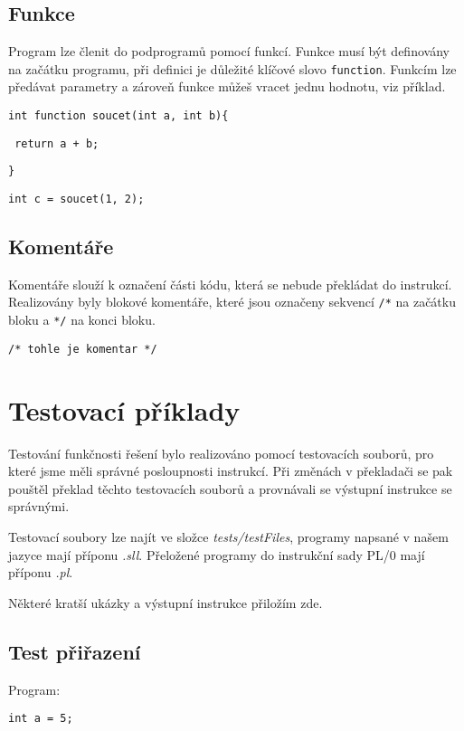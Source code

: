 \documentclass[czech]{thesiskiv}
\begin{document}
\section{Funkce}
Program lze členit do podprogramů pomocí funkcí.
Funkce musí být definovány na začátku programu, při definici je důležité klíčové slovo
\texttt{function}. Funkcím lze předávat parametry a zároveň funkce můžeš vracet jednu hodnotu, viz příklad.


\texttt{int function soucet(int a, int b)\{}

\texttt{    return a + b;}

\texttt{\}}


\texttt{int c = soucet(1, 2);}

\section{Komentáře}
Komentáře slouží k označení části kódu, která se nebude překládat do instrukcí.
Realizovány byly blokové komentáře, které jsou označeny sekvencí \texttt{/*} na začátku bloku
a \texttt{*/} na konci bloku.


\texttt{/* tohle je komentar */}

               
\chapter{Testovací příklady}
Testování funkčnosti řešení bylo realizováno pomocí testovacích souborů, pro které jsme měli správné posloupnosti instrukcí.
Při změnách v překladači se pak pouštěl překlad těchto testovacích souborů a provnávali se výstupní instrukce se správnými.

\noindent Testovací soubory lze najít ve složce \textit{tests/testFiles}, programy napsané v našem jazyce mají příponu \textit{.sll}.
Přeložené programy do instrukční sady PL/0 mají příponu \textit{.pl}.

\noindent Některé kratší ukázky a výstupní instrukce přiložím zde.

\section{Test přiřazení}

Program:

\texttt{int a = 5;}
\end{document}
